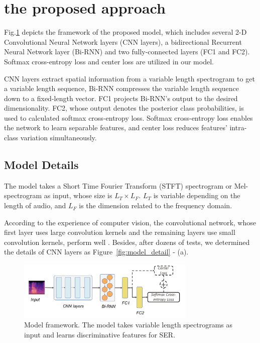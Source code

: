 \documentclass{article}
\begin{document}
\section{the proposed approach}




Fig.\ref{fig:model-framework} depicts the framework of the proposed model, which includes several 2-D Convolutional Neural Network layers ({CNN layers}), a bidirectional Recurrent Neural Network layer ({Bi-RNN}) and two fully-connected layers (FC1 and FC2). Softmax cross-entropy loss and center loss are utilized in our model.

CNN layers extract spatial information from a variable length spectrogram to get a variable length sequence, Bi-RNN compresses the variable length sequence down to a fixed-length vector. FC1 projects Bi-RNN's output to the desired dimensionality. FC2, whose output denotes the posterior class probabilities, is used to calculated softmax cross-entropy loss. Softmax cross-entropy loss enables the network to learn separable features, and center loss reduces features' intra-class variation simultaneously.
\subsection{Model Details}
\label{ssec:model-detail}
The model takes a Short Time Fourier Transform ({STFT}) spectrogram or Mel-spectrogram as input, whose size is $L_T \times L_F$. $L_T$ is variable depending on the length of audio, and $L_F$ is the dimension related to the frequency domain.

According to the experience of computer vision, the convolutional network, whose first layer uses large convolution kernels and the remaining layers use small convolution kernels, perform well \cite{simonyan2014very, He2015Deep}. Besides, after dozens of tests, we determined the details of CNN layers as Figure~\ref{fig:model_detail} - (a).

\begin{figure}[htb]
	
	\begin{minipage}[b]{1.0\linewidth}
		\centerline{\includegraphics[width=8.5cm]{fig1}}
	\end{minipage}
	\caption{Model framework. The model takes variable length spectrograms as input and learns discriminative features for SER.}
	\label{fig:model-framework}
\end{figure}
\end{document}
